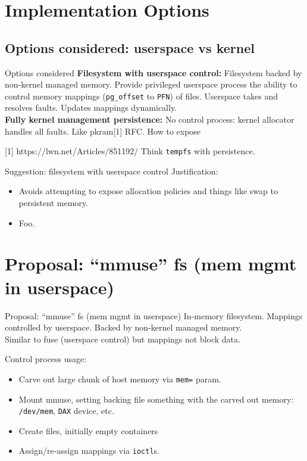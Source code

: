 \documentclass{beamer}
\begin{document}
\section{Implementation Options}

\subsection{Options considered: userspace vs kernel}
\begin{frame}{Options considered}
  \textbf{Filesystem with userspace control:} Filesystem backed by non-kernel managed memory.
  Provide privileged userspace process the ability to control memory mappings (\texttt{pg\_offset} to \texttt{PFN}) of files.
  Userspace takes and resolves faults. Updates mappings dynamically.\\
  
  \textbf{Fully kernel management persistence:} No control process: kernel allocator handles all faults.
  Like pkram[1] RFC. How to expose 

  [1] https://lwn.net/Articles/851192/
  Think \texttt{tempfs} with persistence.
\end{frame}

\begin{frame}{Suggestion: filesystem with userspace control}
  Justification:
  \begin{itemize}
    \item Avoids attempting to expose allocation policies and things like swap to persistent memory.
    \item Foo.
  \end{itemize}
\end{frame}

\section{Proposal: ``mmuse'' fs (mem mgmt in userspace)}
\begin{frame}{Proposal: ``mmuse'' fs (mem mgmt in userspace)}
  In-memory filesystem. Mappings controlled by userspace. Backed by non-kernel managed memory.\\

  Similar to fuse (userspace control) but mappings not block data.

  Control process usage:
  \begin{itemize}
    \item Carve out large chunk of host memory via \texttt{mem=} param.
    \item Mount mmuse, setting backing file something with the carved out memory: \texttt{/dev/mem}, \texttt{DAX} device, etc.
    \item Create files, initially empty containers
    \item Assign/re-assign mappings via \texttt{ioctl}s.
  \end{itemize}
\end{frame}
\end{document}
